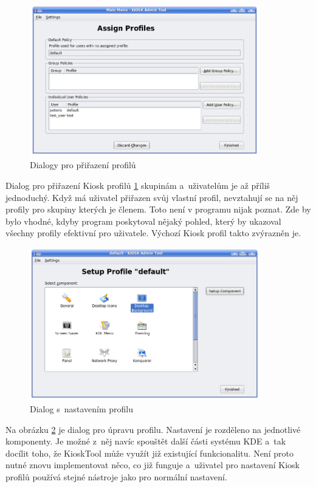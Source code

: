 \begin{figure}[h]
    \centering
    \includegraphics[width=10cm]{obrazky/KioskToolKDE3/prirazeni_profilu.png}
    \caption{Dialogy pro přiřazení profilů}
    \label{fig:kt3_prirazeni}
\end{figure}
Dialog pro přiřazení Kiosk profilů \ref{fig:kt3_prirazeni} skupinám a~uživatelům je až příliš jednoduchý. Když má uživatel přiřazen svůj vlastní profil, nevztahují se na něj profily pro skupiny kterých je členem. Toto není v programu nijak poznat. Zde by bylo vhodné, kdyby program poskytoval nějaký pohled, který by ukazoval všechny profily efektivní pro uživatele. Výchozí Kiosk profil takto zvýrazněn je.

\begin{figure}[h]
    \centering
    \includegraphics[width=10cm]{obrazky/KioskToolKDE3/seznam_komponent.png}
    \caption{Dialog s~nastavením profilu}
    \label{fig:kt3_nast_prof}
\end{figure}
Na obrázku \ref{fig:kt3_nast_prof} je dialog pro úpravu profilu. Nastavení je rozděleno na jednotlivé komponenty. Je možné z~něj navíc spouštět další části systému KDE a~tak docílit toho, že KioskTool může využít již existující funkcionalitu. Není proto nutné znovu implementovat něco, co již funguje a~uživatel pro nastavení Kiosk profilů používá stejné nástroje jako pro normální nastavení.

